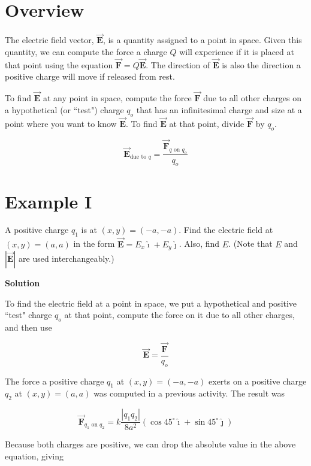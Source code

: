 \documentclass{article}
\newcommand{\ihat}[0]{\hat{\boldsymbol{\imath}}}
\newcommand{\jhat}[0]{\hat{\boldsymbol{\jmath}}}
\newcommand{\bfvec}[1]{\vec{\mathbf{#1}}}
\begin{document}

\section{Overview}

The electric field vector, $\bfvec{E}$, is a quantity assigned to a point in space. Given this quantity, we can compute the force a charge $Q$ will experience if it is placed at that point using the equation $\bfvec{F}=Q\bfvec{E}$. The direction of $\bfvec{E}$ is also the direction a positive charge will move if released from rest.

To find $\bfvec{E}$ at any point in space, 
compute the force $\bfvec{F}$ due to all other charges on a hypothetical (or ``test") charge $q_o$ that has an infinitesimal charge and size at a point where you want to know $\bfvec{E}$. To find $\bfvec{E}$ at that point, divide $\bfvec{F}$ by $q_o$.

$$\bfvec{E}_{\text{due to }q} = \frac{\bfvec{F}_{q\text{ on }q_o}}{q_o}$$


\section{Example I}

A positive charge $q_1$ is at $(x,y)=(-a,-a)$. Find the electric field at $(x,y)=(a,a)$ in the form $\bfvec{E}=E_x\ihat + E_y\jhat$. Also, find $E$. (Note that $E$ and $|\bfvec{E}|$ are used interchangeably.)

\textbf{Solution}

To find the electric field at a point in space, we put a hypothetical and positive ``test" charge $q_o$ at that point, compute the force on it due to all other charges, and then use

$$\bfvec{E} = \frac{\bfvec{F}}{q_o}$$

The force a positive charge $q_1$ at $(x,y)=(-a,-a)$ exerts on a positive charge $q_2$ at $(x,y)=(a, a)$ was computed in a previous activity. The result was

$$\bfvec{F}_{q_1\text{ on } q_2}=k\frac{|q_1q_2|}{8a^2}(\cos 45^\circ \ihat + \sin 45^\circ \jhat)$$

Because both charges are positive, we can drop the absolute value in the above equation, giving
\end{document}
